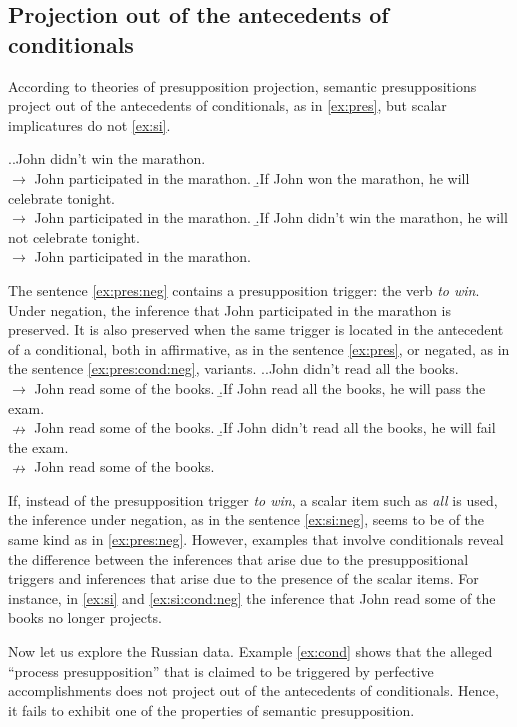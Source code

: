 \subsection{Projection out of the antecedents of conditionals}
According to theories of presupposition projection, semantic presuppositions project out of the antecedents of conditionals, as in \ref{ex:pres}, but scalar implicatures do not \ref{ex:si}.

\ex.\a.\label{ex:pres:neg}John didn't win the marathon.\\
$\rightarrow$ John participated in the marathon.
\b.\label{ex:pres}If John won the marathon, he will celebrate tonight.\\
$\rightarrow$ John participated in the marathon.
\b.\label{ex:pres:cond:neg}If John didn't win the marathon, he will not celebrate tonight.\\
$\rightarrow$ John participated in the marathon.

The sentence \ref{ex:pres:neg} contains a presupposition trigger: the verb \textit{to win}. Under negation, the inference that John participated in the marathon is preserved. It is also preserved when the same trigger is located in the antecedent of a conditional, both in affirmative, as in the sentence \ref{ex:pres}, or negated, as in the sentence \ref{ex:pres:cond:neg}, variants.
\ex.\a.\label{ex:si:neg}John didn't read all the books.\\
$\rightarrow$ John read some of the books.
\b.\label{ex:si}If John read all the books, he will pass the exam.\\
$\nrightarrow$ John read some of the books.
\b.\label{ex:si:cond:neg}If John didn't read all the books, he will fail the exam.\\
$\nrightarrow$ John read some of the books.

If, instead of the presupposition trigger \textit{to win}, a scalar item such as \textit{all} is used, the inference under negation, as in the sentence \ref{ex:si:neg}, seems to be of the same kind as in \ref{ex:pres:neg}. However, examples that involve conditionals reveal the difference between the inferences that arise due to the presuppositional triggers and inferences that arise due to the presence of the scalar items. For instance, in \ref{ex:si} and \ref{ex:si:cond:neg} the inference that John read some of the books no longer projects.

Now let us explore the Russian data. Example \ref{ex:cond} shows that the alleged ``process presupposition'' that is claimed to be triggered by perfective accomplishments does not project out of the antecedents of conditionals. Hence, it fails to exhibit one of the properties of semantic presupposition.

